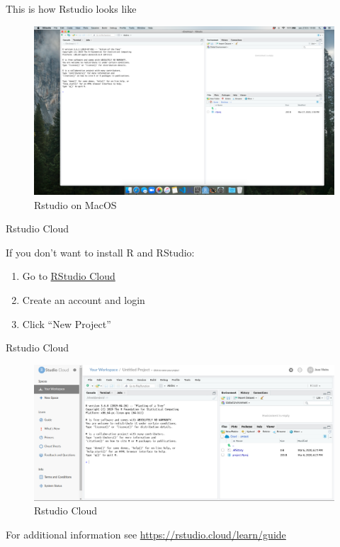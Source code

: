 \documentclass[ignorenonframetext,]{beamer}
\begin{document}
\begin{frame}{This is how Rstudio looks like}
\protect\hypertarget{this-is-how-rstudio-looks-like}{}

\begin{figure}[H]
\includegraphics[scale = 0.15]{figures/Screenshot_mac}%
\caption{Rstudio on MacOS}
\end{figure}

\end{frame}

\begin{frame}{Rstudio Cloud}
\protect\hypertarget{rstudio-cloud}{}

If you don't want to install R and RStudio:

\begin{enumerate}
\item
  Go to \href{https://rstudio.cloud/}{RStudio Cloud}
\item
  Create an account and login
\item
  Click ``New Project''
\end{enumerate}

\end{frame}

\begin{frame}{Rstudio Cloud}
\protect\hypertarget{rstudio-cloud-1}{}

\begin{figure}[H]
\includegraphics[scale = .3]{figures/Screenshot_6} 
\caption{Rstudio Cloud}
\end{figure}

For additional information see \url{https://rstudio.cloud/learn/guide}

\end{frame}
\end{document}
